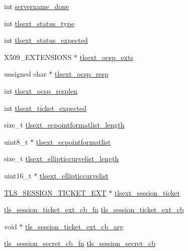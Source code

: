 \begin{DoxyCompactItemize}
int \hyperlink{structssl__st_ac1ac6725cca99bc51b875fbe62ccb504}{servername\+\_\+done}
\item 
int \hyperlink{structssl__st_aba46c200c19caf4051d001f5ca0475e3}{tlsext\+\_\+status\+\_\+type}
\item 
int \hyperlink{structssl__st_a0a0d75de2cdedb99c07403d56aa9ae8c}{tlsext\+\_\+status\+\_\+expected}
\item 
X509\+\_\+\+E\+X\+T\+E\+N\+S\+I\+O\+NS $\ast$ \hyperlink{structssl__st_a234c465dc9c34dde4ac3cc24a79467a1}{tlsext\+\_\+ocsp\+\_\+exts}
\item 
unsigned char $\ast$ \hyperlink{structssl__st_ab54a13d08a8b115b2a7897c9213b1fb7}{tlsext\+\_\+ocsp\+\_\+resp}
\item 
int \hyperlink{structssl__st_a4a86cdf17eb779e0d6e467105103eb5f}{tlsext\+\_\+ocsp\+\_\+resplen}
\item 
int \hyperlink{structssl__st_ac3163b212ec333ebcfba794e683be1d2}{tlsext\+\_\+ticket\+\_\+expected}
\item 
size\+\_\+t \hyperlink{structssl__st_a1661bf580598984c531b321c0a005d37}{tlsext\+\_\+ecpointformatlist\+\_\+length}
\item 
uint8\+\_\+t $\ast$ \hyperlink{structssl__st_adef7594aae7490bba474778a3cf35dc0}{tlsext\+\_\+ecpointformatlist}
\item 
size\+\_\+t \hyperlink{structssl__st_ac0a9a07be2d0e0f83b0844b61e82d06f}{tlsext\+\_\+ellipticcurvelist\+\_\+length}
\item 
uint16\+\_\+t $\ast$ \hyperlink{structssl__st_ade22f9d20414c2f8e317ca9c2b75a111}{tlsext\+\_\+ellipticcurvelist}
\item 
\hyperlink{ssl_8h_a6f21bcd57af48df2c3043423ec10f7d2}{T\+L\+S\+\_\+\+S\+E\+S\+S\+I\+O\+N\+\_\+\+T\+I\+C\+K\+E\+T\+\_\+\+E\+XT} $\ast$ \hyperlink{structssl__st_a88b1275f3d5733e3e856fe8c09d18566}{tlsext\+\_\+session\+\_\+ticket}
\item 
\hyperlink{ssl_8h_a8682d624fb1a55e1b7b036538f5c988c}{tls\+\_\+session\+\_\+ticket\+\_\+ext\+\_\+cb\+\_\+fn} \hyperlink{structssl__st_adfbd96d1abce945f541c432379fc994f}{tls\+\_\+session\+\_\+ticket\+\_\+ext\+\_\+cb}
\item 
void $\ast$ \hyperlink{structssl__st_a45dd63c101fc5b96773ab292285962a4}{tls\+\_\+session\+\_\+ticket\+\_\+ext\+\_\+cb\+\_\+arg}
\item 
\hyperlink{ssl_8h_aca102e595fe3f74f0af8a21c4b40cdb5}{tls\+\_\+session\+\_\+secret\+\_\+cb\+\_\+fn} \hyperlink{structssl__st_aff0b13d0e1261db9771d7cf0e64cc5cc}{tls\+\_\+session\+\_\+secret\+\_\+cb}
\item 

\end{DoxyCompactItemize}
